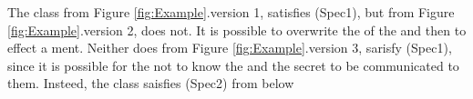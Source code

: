 The class  from Figure \ref{fig:Example}.version 1, satisfies (Spec1), but  from Figure \ref{fig:Example}.version 2, does not.
It is possible to overwrite the  of the  and then to effect a ment. Neither does  from Figure \ref{fig:Example}.version 3,  sarisfy (Spec1), since it is possible for the  not to know the  and the secret to be 
communicated to them. Insteed, the class saisfies (Spec2) from below
% 
%
%
% 

